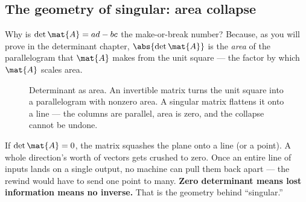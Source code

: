 \subsection{The geometry of singular: area collapse}

Why is $\det\mat{A} = ad - bc$ the make-or-break number? Because, as you will prove in
the determinant chapter, $\abs{\det\mat{A}}$ is the \emph{area} of the parallelogram
that $\mat{A}$ makes from the unit square --- the factor by which $\mat{A}$ scales area.

\begin{figure}[H]
\centering
{}
\caption{Determinant as area. An invertible matrix turns the unit square into a
parallelogram with nonzero area. A singular matrix flattens it onto a line --- the
columns are parallel, area is zero, and the collapse cannot be undone.}
\label{ch08:areacollapse}
\end{figure}

\begin{intuitionbox}
If $\det\mat{A} = 0$, the matrix squashes the plane onto a line (or a point). A whole
direction's worth of vectors gets crushed to zero. Once an entire line of inputs lands on
a single output, no machine can pull them back apart --- the rewind would have to send
one point to many. \textbf{Zero determinant means lost information means no inverse.}
That is the geometry behind ``singular.''
\end{intuitionbox}

